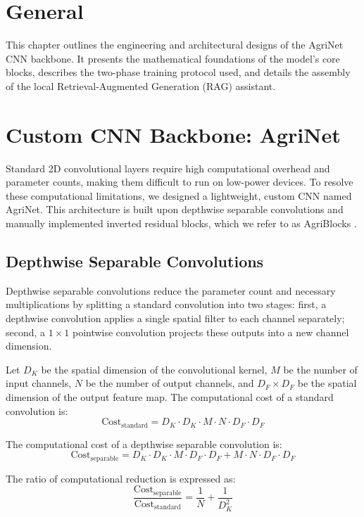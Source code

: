 \documentclass[12pt, a4paper]{report}
\begin{document}
\section{General}
This chapter outlines the engineering and architectural designs of the AgriNet CNN backbone. It presents the mathematical foundations of the model's core blocks, describes the two-phase training protocol used, and details the assembly of the local Retrieval-Augmented Generation (RAG) assistant.

\section{Custom CNN Backbone: AgriNet}
Standard 2D convolutional layers require high computational overhead and parameter counts, making them difficult to run on low-power devices. To resolve these computational limitations, we designed a lightweight, custom CNN named AgriNet. This architecture is built upon depthwise separable convolutions and manually implemented inverted residual blocks, which we refer to as AgriBlocks \cite{mobilenetv2}.

\subsection{Depthwise Separable Convolutions}
Depthwise separable convolutions reduce the parameter count and necessary multiplications by splitting a standard convolution into two stages: first, a depthwise convolution applies a single spatial filter to each channel separately; second, a $1 \times 1$ pointwise convolution projects these outputs into a new channel dimension.

Let $D_K$ be the spatial dimension of the convolutional kernel, $M$ be the number of input channels, $N$ be the number of output channels, and $D_F \times D_F$ be the spatial dimension of the output feature map. The computational cost of a standard convolution is:
\begin{equation}
\text{Cost}_{\text{standard}} = D_K \cdot D_K \cdot M \cdot N \cdot D_F \cdot D_F
\end{equation}

The computational cost of a depthwise separable convolution is:
\begin{equation}
\text{Cost}_{\text{separable}} = D_K \cdot D_K \cdot M \cdot D_F \cdot D_F + M \cdot N \cdot D_F \cdot D_F
\end{equation}

The ratio of computational reduction is expressed as:
\begin{equation}
\frac{\text{Cost}_{\text{separable}}}{\text{Cost}_{\text{standard}}} = \frac{1}{N} + \frac{1}{D_K^2}
\end{equation}
\end{document}
